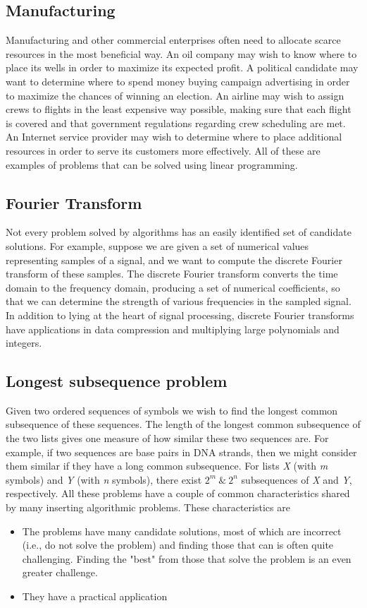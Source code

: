 \documentclass[12pt,a4paper]{book}
\begin{document}
\subsection{Manufacturing}
Manufacturing and other commercial enterprises often need to allocate scarce resources in the most beneficial way. An oil company may wish to know where to place its wells in order to maximize its expected profit. A political candidate may want to determine where to spend money buying campaign advertising in order to maximize the chances of winning an election. An airline may wish to assign crews to flights in the least expensive way possible, making sure that each flight is covered and that government regulations regarding crew scheduling are met. An Internet service provider may wish to determine where to place additional resources in order to serve its customers more effectively. All of these are examples of problems that can be solved using linear programming.
\subsection{Fourier Transform}
\par Not every problem solved by algorithms has an easily identified set of candidate solutions. For example, suppose we are given a set of numerical values representing samples of a signal, and we want to compute the discrete Fourier transform of these samples. The discrete Fourier transform converts the time domain to the frequency domain, producing a set of numerical coefficients, so that we can determine the strength of various frequencies in the sampled signal. In addition to lying at the heart of signal processing, discrete Fourier transforms have applications in data compression and multiplying large polynomials and integers. 

\subsection{Longest subsequence problem}
Given two ordered sequences of symbols we wish to find the longest common subsequence of these sequences. The length of the longest common subsequence of the two lists gives one measure of how similar these two sequences are. For example, if two sequences are base pairs in DNA strands, then we might consider them similar if they have a long common subsequence. For lists \textit{X} (with \textit{m} symbols) and \textit{Y} (with \textit{n} symbols), there exist $2^m   \ \&\ 2^n$ subsequences of \textit{X} and \textit{Y}, respectively.
All these problems have a couple of common characteristics shared by many inserting algorithmic problems. These characteristics are
\begin{itemize}
\item The problems have many candidate solutions, most of which are incorrect (i.e., do not
solve the problem) and finding those that can is often quite challenging. Finding the
"best" from those that solve the problem is an even greater challenge.
\item They have a practical application
\end{itemize}
\end{document}
